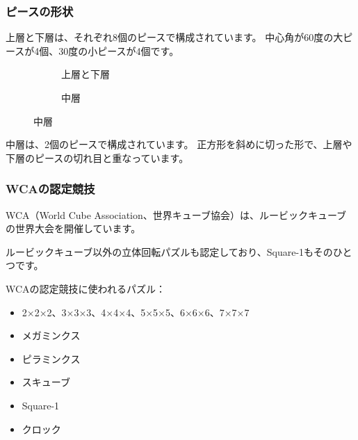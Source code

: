 \documentclass{beamer}
\def\lpiece{-- ([turn]180:1) -- ([turn]-120:1) -- ([turn]-75:0.707) -- cycle}
\def\spiece{-- ([turn]180:1) -- ([turn]-150:1) -- cycle}
\begin{document}
\begin{frame}
    \frametitle{ピースの形状}

    上層と下層は、それぞれ8個のピースで構成されています。
    中心角が60度の大ピースが4個、30度の小ピースが4個です。

    \begin{figure}
        \centering
        \begin{subfigure}{0.40\columnwidth}
            \centering
            \caption{上層と下層}
        \end{subfigure}
        \begin{subfigure}{0.40\columnwidth}
            \centering
            \caption{中層}
        \end{subfigure}
    \end{figure}

    中層は、2個のピースで構成されています。
    正方形を斜めに切った形で、上層や下層のピースの切れ目と重なっています。
\end{frame}

\begin{frame}
    \frametitle{WCAの認定競技}

    WCA（World Cube Association、世界キューブ協会）は、ルービックキューブの世界大会を開催しています。

    ルービックキューブ以外の立体回転パズルも認定しており、Square-1もそのひとつです。

    WCAの認定競技に使われるパズル：
    \begin{itemize}
        \item 2×2×2、3×3×3、4×4×4、5×5×5、6×6×6、7×7×7
        \item メガミンクス
        \item ピラミンクス
        \item スキューブ
        \item Square-1
        \item クロック
    \end{itemize}
\end{frame}
\end{document}
